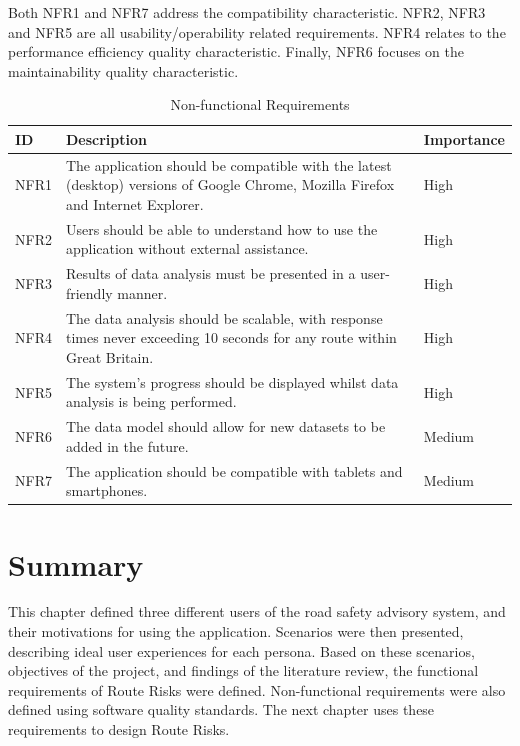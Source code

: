 \documentclass[authoryearcitations]{UoYCSproject}
\begin{document}
Both NFR1 and NFR7 address the compatibility characteristic. NFR2, NFR3 and NFR5 are all usability/operability related requirements. NFR4 relates to the performance efficiency quality characteristic. Finally, NFR6 focuses on the maintainability quality characteristic.

\begin{table}[tbp]
\center
\caption{Non-functional Requirements}
\begin{tabular}{| p{1.5cm} | p{9.5cm} | p{2cm} |}
	\hline
	\textbf{ID} & \textbf{Description} & \textbf{Importance} \\ \hline
	NFR1 & The application should be compatible with the latest (desktop) versions of Google Chrome, Mozilla Firefox and Internet Explorer. & High \\ \hline
	NFR2 & Users should be able to understand how to use the application without external assistance. & High \\ \hline
	NFR3 & Results of data analysis must be presented in a user-friendly manner. & High \\ \hline
	NFR4 & The data analysis should be scalable, with response times never exceeding 10 seconds for any route within Great Britain. & High \\ \hline
	NFR5 & The system's progress should be displayed whilst data analysis is being performed. & High \\ \hline
	NFR6 & The data model should allow for new datasets to be added in the future. & Medium \\ \hline
	NFR7 & The application should be compatible with tablets and smartphones. & Medium \\ \hline
\end{tabular}
\label{tab:NonFunctionalReqs}
\end{table}

\section{Summary}
This chapter defined three different users of the road safety advisory system, and their motivations for using the application. Scenarios were then presented, describing ideal user experiences for each persona. Based on these scenarios, objectives of the project, and findings of the literature review, the functional requirements of Route Risks were defined. Non-functional requirements were also defined using software quality standards. The next chapter uses these requirements to design Route Risks.
\end{document}
